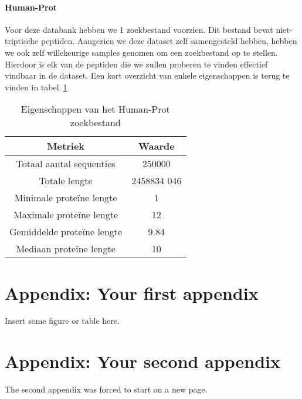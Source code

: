 \documentclass[11pt,dutch,faculty=we,layout=titlefont,underline=false,titleUppercase=true,titleUnderline=true]{ugent2016-report}
\begin{document}

    \paragraph{Human-Prot} Voor deze databank hebben we 1 zoekbestand voorzien.
    Dit bestand bevat niet-triptische peptiden.
    Aangezien we deze dataset zelf samengesteld hebben, hebben we ook zelf willekeurige samples genomen om een zoekbestand op te stellen.
    Hierdoor is elk van de peptiden die we zullen proberen te vinden effectief vindbaar in de dataset.
    Een kort overzicht van enkele eigenschappen is terug te vinden in tabel~\ref{tab:humanprot_zoekbestand}

    \begin{table}[h!]
        \centering
        \begin{tabular}{ c c }
            Metriek                    & Waarde     \\
            \hline\hline
            Totaal aantal sequenties   & 250000     \\
            Totale lengte              & 2458834 046 \\
            Minimale proteïne lengte   & 1          \\
            Maximale proteïne lengte   & 12
            \\
            Gemiddelde proteïne lengte & 9.84     \\
            Mediaan proteïne lengte    & 10        \\
            \hline
        \end{tabular}
        \caption{Eigenschappen van het Human-Prot zoekbestand}
        \label{tab:humanprot_zoekbestand}
    \end{table}


    \printbibliography[heading=bibintoc,title={Referenties}] %


    \appendix


    \section{Appendix: Your first appendix}
    Insert some figure or table here.

    \newpage


    \section{Appendix: Your second appendix}
    The second appendix was forced to start on a new page.
\end{document}
